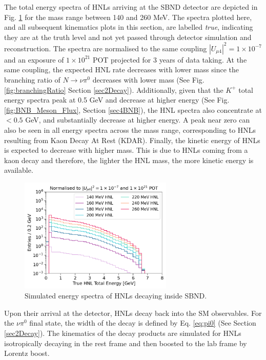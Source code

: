 The total energy spectra of HNLs arriving at the SBND detector are depicted in Fig. \ref{fig:HNL_Energy_Spectrum} for the mass range between 140 and 260 MeV.
The spectra plotted here, and all subsequent kinematics plots in this section, are labelled \textit{true}, indicating they are at the truth level and not yet passed through detector simulation and reconstruction.
The spectra are normalised to the same coupling $|U_{\mu4}|^{2} = 1 \times 10^{-7}$ and an exposure of $1 \times 10^{21}$ POT projected for 3 years of data taking.
At the same coupling, the expected HNL rate decreases with lower mass since the branching ratio of $N \rightarrow \nu\pi^0$ decreases with lower mass (See Fig. \ref{fig:branchingRatio} Section \ref{sec2Decay}).
Additionally, given that the $K^{+}$ total energy spectra peak at 0.5 GeV and decrease at higher energy (See Fig. \ref{fig:BNB_Meson_Flux}, Section \ref{sec4BNB}), the HNL spectra also concentrate at $<0.5$ GeV, and substantially decrease at higher energy. 
A peak near zero can also be seen in all energy spectra across the mass range, corresponding to HNLs resulting from Kaon Decay At Rest (KDAR).
Finally, the kinetic energy of HNLs is expected to decrease with higher mass.
This is due to HNLs coming from a kaon decay and therefore, the lighter the HNL mass, the more kinetic energy is available.

\begin{figure}[hb!] 
\centering    
\includegraphics[width=0.65\textwidth]{HNL_Energy_Spectrum}
\caption[Simulated Energy Spectra of HNLs Decaying Inside SBND]{
Simulated energy spectra of HNLs decaying inside SBND.
}
\label{fig:HNL_Energy_Spectrum}
\end{figure}

Upon their arrival at the detector, HNLs decay back into the SM observables.
For the $\nu\pi^{0}$ final state, the width of the decay is defined by Eq. \ref{eq:pi0} (See Section \ref{sec2Decay}).
The kinematics of the decay products are simulated for HNLs isotropically decaying in the rest frame and then boosted to the lab frame by Lorentz boost.

